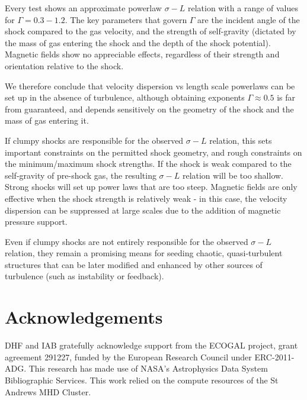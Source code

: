 \documentclass[a4paper,fleqn,usenatbib]{mnras}
\begin{document}
Every test shows an approximate powerlaw $\sigma-L$ relation with a range of values for $\Gamma=0.3-1.2$.  The key parameters that govern $\Gamma$ are the incident angle of the shock compared to the gas velocity, and the strength of self-gravity (dictated by the mass of gas entering the shock and the depth of the shock potential).  Magnetic fields show no appreciable effects, regardless of their strength and orientation relative to the shock.

We therefore conclude that velocity dispersion vs length scale powerlaws can be set up in the absence of turbulence, although obtaining exponents $\Gamma \approx 0.5$ is far from guaranteed, and depends sensitively on the geometry of the shock and the mass of gas entering it.  

If clumpy shocks are responsible for the observed $\sigma-L$ relation, this sets important constraints on the permitted shock geometry, and rough constraints on the minimum/maximum shock strengths.  If the shock is weak compared to the self-gravity of pre-shock gas, the resulting $\sigma-L$ relation will be too shallow.  Strong shocks will set up power laws that are too steep.  Magnetic fields are only effective when the shock strength is relatively weak - in this case, the velocity dispersion can be suppressed at large scales due to the addition of magnetic pressure support.

Even if clumpy shocks are not entirely responsible for the observed $\sigma-L$ relation, they remain a promising means for seeding chaotic, quasi-turbulent structures that can be later modified and enhanced by other sources of turbulence (such as instability or feedback).



\section*{Acknowledgements}

DHF and IAB gratefully acknowledge support from the ECOGAL project, grant agreement 291227, funded by the European Research Council under ERC-2011-ADG.  This  research  has  made  use  of  NASA's  Astrophysics  Data  System Bibliographic  Services.  This work relied on the compute resources of the St Andrews MHD Cluster. 





 




\bsp	%
\label{lastpage}
\end{document}
